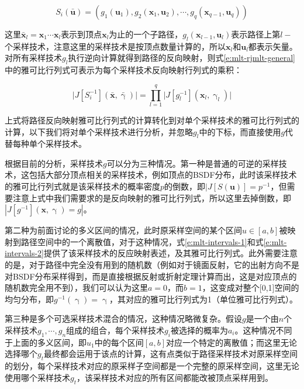 \begin{equation}
	S_i(\bar{\mathbf{u}})=(g_1(\mathbf{u}_1),g_2(\mathbf{x}_1,\mathbf{u}_2),\cdots,g_q(\mathbf{x}_{q-1},\mathbf{u}_q))
\end{equation}

\noindent 这里$\bar{\mathbf{x}}_l=\mathbf{x}_1\cdots\mathbf{x}_l$表示到顶点$\mathbf{x}_l$为止的一个子路径，$g_l(\mathbf{x}_{l-1},\mathbf{u}_l)$表示路径上第$l-$个采样技术，注意这里的采样技术是按顶点数量计算的，所以$\mathbf{x}_l$和$\mathbf{u}_l$都表示矢量。对所有采样技术$g_l$执行逆向计算就得到路径的反向映射，则式\ref{e:mlt-rjmlt-general}中的雅可比行列式可表示为每个采样技术反向映射行列式的乘积：

\begin{equation}
	\big|J[S^{-1}_i](\bar{\mathbf{x}},\bar{\upgamma})\big|=\prod^{q}_{l=1}\big|J[g^{-1}_l](\mathbf{x}_l,\upgamma_l)\big|
\end{equation}

\noindent 上式将路径反向映射雅可比行列式的计算转化到对单个采样技术的雅可比行列式的计算，以下我们将对单个采样技术进行分析，并忽略$g_l$中的下标，而直接使用$g$代替每种单个采样技术。

根据目前的分析，采样技术$g$可以分为三种情况。第一种是普通的可逆的采样技术，这包括大部分顶点相关的采样技术，例如顶点的BSDF分布，此时该采样技术的雅可比行列式就是该采样技术的概率密度$p$的倒数，即$|J[S(\mathbf{u})]=p^{-1}$，但需要注意上式中我们需要求的是反向映射的雅可比行列式，所以这里去掉倒数，即$|J[g^{-1}](\mathbf{x},\upgamma)=g|$。

第二种为前面讨论的多义区间的情况，此时原采样空间的某个区间$u\in[a,b]$被映射到路径空间中的一个离散值，对于这种情况，式\ref{e:mlt-intervals-1}和式\ref{e:mlt-intervals-2}提供了该采样技术的反应映射表述，及其雅可比行列式。此外需要注意的是，对于路径中完全没有用到的随机数（例如对于镜面反射，它的出射方向不是对BSDF分布采样得到，而是直接根据反射或折射定理计算而出，这是对应顶点的随机数完全用不到），我们可以认为这里$a=0$，而$b=1$，这变成对整个[0,1]空间的均匀分布，即$g^{-1}(\upgamma)=\upgamma$，其对应的雅可比行列式为1（单位雅可比行列式）。

第三种是多个可选采样技术混合的情况，这种情况略微复杂。假设$g$是一个由$n$个采样技术$g_1,\cdots,g_n$组成的组合，每个采样技术$g_i$被选择的概率为$a_i$。这种情况不同于上面的多义区间，即$u_1$中的每个区间$[a,b]$对应一个特定的离散值；而这里无论选择哪个$g_t$最终都会运用于该点的计算，这有点类似于路径采样技术对原采样空间的划分，每个采样技术对应的原采样子空间都是一个完整的原采样空间，这里无论使用哪个采样技术$g_t$，该采样技术对应的所有区间都能改被顶点采样用到。

